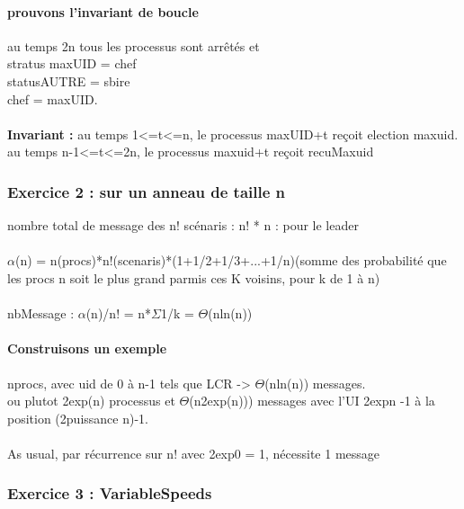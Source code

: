 \documentclass{article}
\begin{document}
\paragraph{prouvons l'invariant de boucle} au temps 2n tous les processus sont arrêtés et\\stratus maxUID = chef\\statusAUTRE = sbire\\chef = maxUID.\\\\
\textbf{Invariant : }au temps 1<=t<=n, le processus maxUID+t reçoit election maxuid.\\au temps n-1<=t<=2n, le processus maxuid+t reçoit recuMaxuid
\subsubsection{Exercice 2 : sur un anneau de taille n}nombre total de message des n! scénaris : n! * n : pour le leader\\\\$\alpha$(n) = n(procs)*n!(scenaris)*(1+1/2+1/3+...+1/n)(somme des probabilité que les procs n soit le plus grand parmis ces K voisins, pour k de 1 à n)\\\\nbMessage : $\alpha$(n)/n! = n*$\Sigma$1/k = $\Theta$(nln(n))
\paragraph{Construisons un exemple} nprocs, avec uid de 0 à n-1 tels que LCR -> $\Theta$(nln(n)) messages.\\ou plutot 2exp(n) processus et $\Theta$(n2exp(n))) messages avec l'UI 2expn -1 à la position (2puissance n)-1.\\\\
As usual, par récurrence sur n! avec 2exp0 = 1, nécessite 1 message
\subsubsection{Exercice 3 : VariableSpeeds} 
\end{document}
